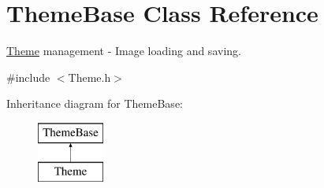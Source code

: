 \hypertarget{class_theme_base}{}\section{Theme\+Base Class Reference}
\label{class_theme_base}


\hyperlink{class_theme}{Theme} management -\/ Image loading and saving.  




{\ttfamily \#include $<$Theme.\+h$>$}

Inheritance diagram for Theme\+Base\+:\begin{figure}[H]
\begin{center}
\leavevmode
\includegraphics[height=2.000000cm]{class_theme_base}
\end{center}
\end{figure}
